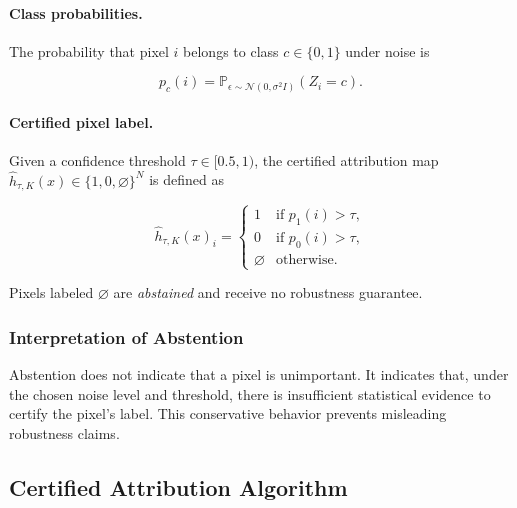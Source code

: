\documentclass[11pt]{article}
\begin{document}
\paragraph{Class probabilities.}
The probability that pixel $i$ belongs to class $c \in \{0,1\}$ under noise is

$$
p_c(i) = \mathbb{P}_{\epsilon \sim \mathcal{N}(0, \sigma^2 I)}\left(Z_i = c\right).
$$

\paragraph{Certified pixel label.}
Given a confidence threshold $\tau \in [0.5,1)$, the certified attribution map $\hat{h}_{\tau,K}(x) \in \{1,0,\varnothing\}^N$ is defined as

$$
\hat{h}_{\tau,K}(x)_i =
\begin{cases}
1 & \text{if } p_1(i) > \tau, \\
0 & \text{if } p_0(i) > \tau, \\
\varnothing & \text{otherwise}.
\end{cases}
$$

Pixels labeled $\varnothing$ are \emph{abstained} and receive no robustness guarantee.

\subsubsection{Interpretation of Abstention}
Abstention does not indicate that a pixel is unimportant.
It indicates that, under the chosen noise level and threshold,
there is insufficient statistical evidence to certify the pixel’s label.
This conservative behavior prevents misleading robustness claims.


\subsection{Certified Attribution Algorithm}
\end{document}
